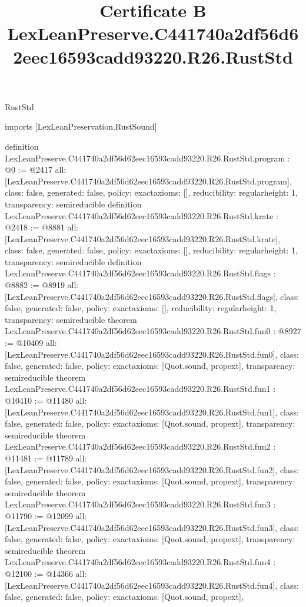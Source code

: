 \begin{lexlean}{RustStd}
\title{Certificate B LexLeanPreserve.C441740a2df56d62eec16593cadd93220.R26.RustStd}
\begin{coremodule}
imports [LexLeanPreservation.RustSound]

definition LexLeanPreserve.C441740a2df56d62eec16593cadd93220.R26.RustStd.program : @0 := @2417 {
  all: [LexLeanPreserve.C441740a2df56d62eec16593cadd93220.R26.RustStd.program],
  class: false,
  generated: false,
  policy: exact{axioms: []},
  reducibility: regular{height: 1},
  transparency: semireducible
}
definition LexLeanPreserve.C441740a2df56d62eec16593cadd93220.R26.RustStd.krate : @2418 := @8881 {
  all: [LexLeanPreserve.C441740a2df56d62eec16593cadd93220.R26.RustStd.krate],
  class: false,
  generated: false,
  policy: exact{axioms: []},
  reducibility: regular{height: 1},
  transparency: semireducible
}
definition LexLeanPreserve.C441740a2df56d62eec16593cadd93220.R26.RustStd.flags : @8882 := @8919 {
  all: [LexLeanPreserve.C441740a2df56d62eec16593cadd93220.R26.RustStd.flags],
  class: false,
  generated: false,
  policy: exact{axioms: []},
  reducibility: regular{height: 1},
  transparency: semireducible
}
theorem LexLeanPreserve.C441740a2df56d62eec16593cadd93220.R26.RustStd.fun0 : @8927 := @10409 {
  all: [LexLeanPreserve.C441740a2df56d62eec16593cadd93220.R26.RustStd.fun0],
  class: false,
  generated: false,
  policy: exact{axioms: [Quot.sound, propext]},
  transparency: semireducible
}
theorem LexLeanPreserve.C441740a2df56d62eec16593cadd93220.R26.RustStd.fun1 : @10410 := @11480 {
  all: [LexLeanPreserve.C441740a2df56d62eec16593cadd93220.R26.RustStd.fun1],
  class: false,
  generated: false,
  policy: exact{axioms: [Quot.sound, propext]},
  transparency: semireducible
}
theorem LexLeanPreserve.C441740a2df56d62eec16593cadd93220.R26.RustStd.fun2 : @11481 := @11789 {
  all: [LexLeanPreserve.C441740a2df56d62eec16593cadd93220.R26.RustStd.fun2],
  class: false,
  generated: false,
  policy: exact{axioms: [Quot.sound, propext]},
  transparency: semireducible
}
theorem LexLeanPreserve.C441740a2df56d62eec16593cadd93220.R26.RustStd.fun3 : @11790 := @12099 {
  all: [LexLeanPreserve.C441740a2df56d62eec16593cadd93220.R26.RustStd.fun3],
  class: false,
  generated: false,
  policy: exact{axioms: [Quot.sound, propext]},
  transparency: semireducible
}
theorem LexLeanPreserve.C441740a2df56d62eec16593cadd93220.R26.RustStd.fun4 : @12100 := @14366 {
  all: [LexLeanPreserve.C441740a2df56d62eec16593cadd93220.R26.RustStd.fun4],
  class: false,
  generated: false,
  policy: exact{axioms: [Quot.sound, propext]},
}
\end{coremodule}
\end{lexlean}

